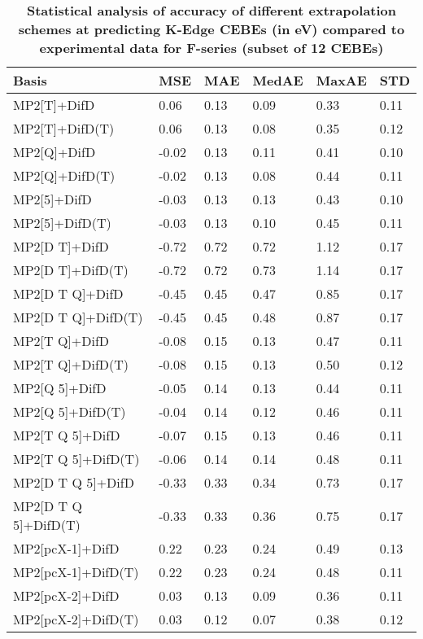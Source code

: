 \begin{table}
  \caption{\textbf{Statistical analysis of accuracy of different extrapolation schemes at predicting K-Edge CEBEs (in eV) compared to experimental data for F-series (subset of 12 CEBEs)}}
  \begin{tabular}{l l l l l l }
    \toprule
    \textbf{Basis} & \textbf{MSE} & \textbf{MAE} & \textbf{MedAE} & \textbf{MaxAE} & \textbf{STD} \\ 
    \midrule
    MP2[T]+DifD & 0.06 & 0.13 & 0.09 & 0.33 & 0.11 \\ 
    MP2[T]+DifD(T) & 0.06 & 0.13 & 0.08 & 0.35 & 0.12 \\ 
    MP2[Q]+DifD & -0.02 & 0.13 & 0.11 & 0.41 & 0.10 \\ 
    MP2[Q]+DifD(T) & -0.02 & 0.13 & 0.08 & 0.44 & 0.11 \\ 
    MP2[5]+DifD & -0.03 & 0.13 & 0.13 & 0.43 & 0.10 \\ 
    MP2[5]+DifD(T) & -0.03 & 0.13 & 0.10 & 0.45 & 0.11 \\ 
    MP2[D T]+DifD & -0.72 & 0.72 & 0.72 & 1.12 & 0.17 \\ 
    MP2[D T]+DifD(T) & -0.72 & 0.72 & 0.73 & 1.14 & 0.17 \\ 
    MP2[D T Q]+DifD & -0.45 & 0.45 & 0.47 & 0.85 & 0.17 \\ 
    MP2[D T Q]+DifD(T) & -0.45 & 0.45 & 0.48 & 0.87 & 0.17 \\ 
    MP2[T Q]+DifD & -0.08 & 0.15 & 0.13 & 0.47 & 0.11 \\ 
    MP2[T Q]+DifD(T) & -0.08 & 0.15 & 0.13 & 0.50 & 0.12 \\ 
    MP2[Q 5]+DifD & -0.05 & 0.14 & 0.13 & 0.44 & 0.11 \\ 
    MP2[Q 5]+DifD(T) & -0.04 & 0.14 & 0.12 & 0.46 & 0.11 \\ 
    MP2[T Q 5]+DifD & -0.07 & 0.15 & 0.13 & 0.46 & 0.11 \\ 
    MP2[T Q 5]+DifD(T) & -0.06 & 0.14 & 0.14 & 0.48 & 0.11 \\ 
    MP2[D T Q 5]+DifD & -0.33 & 0.33 & 0.34 & 0.73 & 0.17 \\ 
    MP2[D T Q 5]+DifD(T) & -0.33 & 0.33 & 0.36 & 0.75 & 0.17 \\ 
    MP2[pcX-1]+DifD & 0.22 & 0.23 & 0.24 & 0.49 & 0.13 \\ 
    MP2[pcX-1]+DifD(T) & 0.22 & 0.23 & 0.24 & 0.48 & 0.11 \\ 
    MP2[pcX-2]+DifD & 0.03 & 0.13 & 0.09 & 0.36 & 0.11 \\ 
    MP2[pcX-2]+DifD(T) & 0.03 & 0.12 & 0.07 & 0.38 & 0.12 \\ 

\end{tabular}
\end{table}

